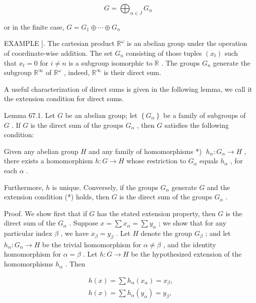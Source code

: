 \[
G = {\bigoplus }_{\alpha  \in  J}{G}_{\alpha }
\]

or in the finite case, \(G = {G}_{1} \oplus  \cdots  \oplus  {G}_{n}\)

EXAMPLE ]. The cartesian product \({\mathbb{R}}^{\omega }\) is an abelian group under the operation of coordinate-wise addition. The set \({G}_{n}\) consisting of those tuples \(\left( {x}_{t}\right)\) such that \({x}_{t} = 0\) for \(i \neq  n\) is a subgroup isomorphic to \(\mathbb{R}\) . The groups \({G}_{n}\) generate the subgroup \({\mathbb{R}}^{\infty }\) of \({\mathbb{R}}^{\omega }\) , indeed, \({\mathbb{R}}^{\infty }\) is their direct sum.

A useful characterization of direct sums is given in the following lemma, we call it the extension condition for direct sums.

Lemma 67.1. Let \(G\) be an abelian group; let \(\left\{  {G}_{\alpha }\right\}\) be a family of subgroups of \(G\) . If \(G\) is the direct sum of the groups \({G}_{\alpha }\) , then \(G\) satisfies the following condition:

Given any abelian group \(H\) and any family of homomorphisms *) \(\;{h}_{\alpha } : {G}_{\alpha } \rightarrow  H\) , there exists a homomorphism \(h : G \rightarrow  H\) whose restriction to \({G}_{\alpha }\) equals \({h}_{\alpha }\) , for each \(\alpha\) .

Furthermore, \(h\) is unique. Conversely, if the groups \({G}_{\alpha }\) generate \(G\) and the extension condition (*) holds, then \(G\) is the direct sum of the groups \({G}_{\alpha }\) .

Proof. We show first that if \(G\) has the stated extension property, then \(G\) is the direct sum of the \({G}_{\alpha }\) . Suppose \(x = \sum {x}_{\alpha } = \sum {y}_{\alpha }\) ; we show that for any particular index \(\beta\) , we have \({x}_{\beta } = {y}_{\beta }\) . Let \(H\) denote the group \({G}_{\beta }\) ; and let \({h}_{\alpha } : {G}_{\alpha } \rightarrow  H\) be the trivial homomorphism for \(\alpha  \neq  \beta\) , and the identity homomorphism for \(\alpha  = \beta\) . Let \(h : G \rightarrow  H\) be the hypothesized extension of the homomorphisms \({h}_{\alpha }\) . Then

\[
\begin{aligned}  & h\left( x\right)  = \sum {h}_{\alpha }\left( {x}_{\alpha }\right)  = {x}_{\beta }, \\  & h\left( x\right)  = \sum {h}_{\alpha }\left( {y}_{\alpha }\right)  = {y}_{\beta }, \end{aligned}
\]

